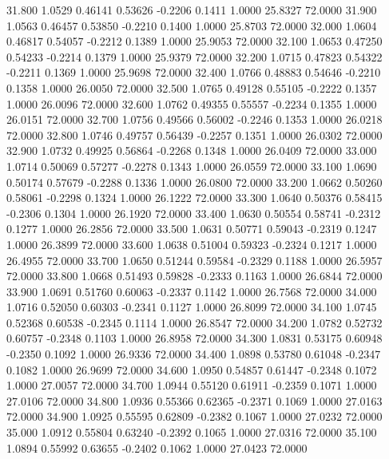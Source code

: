   31.800   1.0529   0.46141   0.53626  -0.2206   0.1411   1.0000  25.8327  72.0000
  31.900   1.0563   0.46457   0.53850  -0.2210   0.1400   1.0000  25.8703  72.0000
  32.000   1.0604   0.46817   0.54057  -0.2212   0.1389   1.0000  25.9053  72.0000
  32.100   1.0653   0.47250   0.54233  -0.2214   0.1379   1.0000  25.9379  72.0000
  32.200   1.0715   0.47823   0.54322  -0.2211   0.1369   1.0000  25.9698  72.0000
  32.400   1.0766   0.48883   0.54646  -0.2210   0.1358   1.0000  26.0050  72.0000
  32.500   1.0765   0.49128   0.55105  -0.2222   0.1357   1.0000  26.0096  72.0000
  32.600   1.0762   0.49355   0.55557  -0.2234   0.1355   1.0000  26.0151  72.0000
  32.700   1.0756   0.49566   0.56002  -0.2246   0.1353   1.0000  26.0218  72.0000
  32.800   1.0746   0.49757   0.56439  -0.2257   0.1351   1.0000  26.0302  72.0000
  32.900   1.0732   0.49925   0.56864  -0.2268   0.1348   1.0000  26.0409  72.0000
  33.000   1.0714   0.50069   0.57277  -0.2278   0.1343   1.0000  26.0559  72.0000
  33.100   1.0690   0.50174   0.57679  -0.2288   0.1336   1.0000  26.0800  72.0000
  33.200   1.0662   0.50260   0.58061  -0.2298   0.1324   1.0000  26.1222  72.0000
  33.300   1.0640   0.50376   0.58415  -0.2306   0.1304   1.0000  26.1920  72.0000
  33.400   1.0630   0.50554   0.58741  -0.2312   0.1277   1.0000  26.2856  72.0000
  33.500   1.0631   0.50771   0.59043  -0.2319   0.1247   1.0000  26.3899  72.0000
  33.600   1.0638   0.51004   0.59323  -0.2324   0.1217   1.0000  26.4955  72.0000
  33.700   1.0650   0.51244   0.59584  -0.2329   0.1188   1.0000  26.5957  72.0000
  33.800   1.0668   0.51493   0.59828  -0.2333   0.1163   1.0000  26.6844  72.0000
  33.900   1.0691   0.51760   0.60063  -0.2337   0.1142   1.0000  26.7568  72.0000
  34.000   1.0716   0.52050   0.60303  -0.2341   0.1127   1.0000  26.8099  72.0000
  34.100   1.0745   0.52368   0.60538  -0.2345   0.1114   1.0000  26.8547  72.0000
  34.200   1.0782   0.52732   0.60757  -0.2348   0.1103   1.0000  26.8958  72.0000
  34.300   1.0831   0.53175   0.60948  -0.2350   0.1092   1.0000  26.9336  72.0000
  34.400   1.0898   0.53780   0.61048  -0.2347   0.1082   1.0000  26.9699  72.0000
  34.600   1.0950   0.54857   0.61447  -0.2348   0.1072   1.0000  27.0057  72.0000
  34.700   1.0944   0.55120   0.61911  -0.2359   0.1071   1.0000  27.0106  72.0000
  34.800   1.0936   0.55366   0.62365  -0.2371   0.1069   1.0000  27.0163  72.0000
  34.900   1.0925   0.55595   0.62809  -0.2382   0.1067   1.0000  27.0232  72.0000
  35.000   1.0912   0.55804   0.63240  -0.2392   0.1065   1.0000  27.0316  72.0000
  35.100   1.0894   0.55992   0.63655  -0.2402   0.1062   1.0000  27.0423  72.0000
